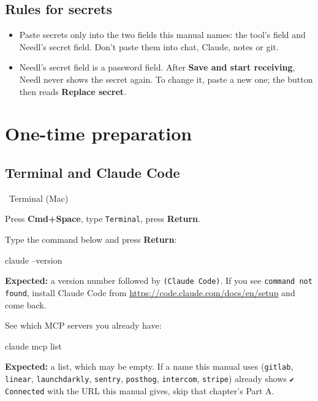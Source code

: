 \documentclass[11pt,a4paper]{article}
\newcommand{\ui}[1]{\textbf{#1}}
\newcommand{\where}[1]{\par\smallskip\noindent\colorbox{winbg}{\color{winfg}\bfseries\strut\ #1\ }\par\nopagebreak[4]}
\newcommand{\lit}[1]{\texttt{#1}}
\begin{document}
\subsection{Rules for secrets}
\begin{itemize}
\item Paste secrets only into the two fields this manual names: the tool's field and Needl's secret field. Don't paste them into chat, Claude, notes or git.
\item Needl's secret field is a password field. After \ui{Save and start receiving}, Needl never shows the secret again. To change it, paste a new one; the button then reads \ui{Replace secret}.
\end{itemize}

\clearpage
\section{One-time preparation}

\subsection{Terminal and Claude Code}
\where{Terminal (Mac)}
\begin{steps}
\item Press \ui{Cmd+Space}, type \lit{Terminal}, press \ui{Return}.
\item Type the command below and press \ui{Return}:
\begin{cmd}
claude --version
\end{cmd}
\textbf{Expected:} a version number followed by \lit{(Claude Code)}. If you see \lit{command not found}, install Claude Code from \url{https://code.claude.com/docs/en/setup} and come back.
\item See which MCP servers you already have:
\begin{cmd}
claude mcp list
\end{cmd}
\textbf{Expected:} a list, which may be empty. If a name this manual uses (\lit{gitlab}, \lit{linear}, \lit{launchdarkly}, \lit{sentry}, \lit{posthog}, \lit{intercom}, \lit{stripe}) already shows \lit{✔ Connected} with the URL this manual gives, skip that chapter's Part A.
\end{steps}
\end{document}
